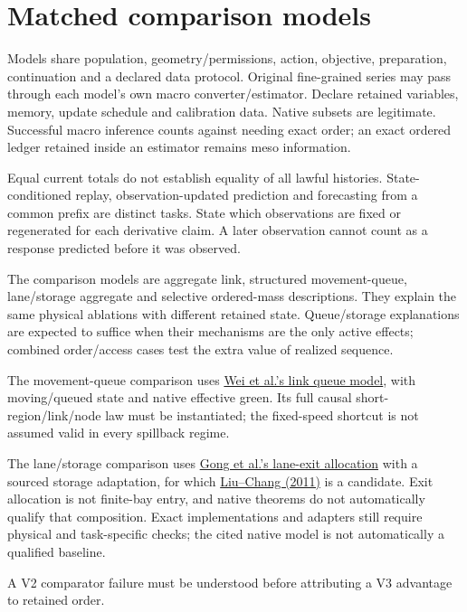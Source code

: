 \documentclass[10pt,a4paper]{article}
\begin{document}
\section{Matched comparison models}

Models share population, geometry/permissions, action, objective,
preparation, continuation and a declared data protocol.
Original fine-grained series may pass through each model's own macro
converter/estimator. Declare retained variables, memory, update schedule
and calibration data. Native subsets are legitimate. Successful macro
inference counts against needing exact order; an exact ordered ledger
retained inside an estimator remains meso information.

Equal current totals do not establish equality of all lawful histories.
State-conditioned replay, observation-updated prediction and forecasting
from a common prefix are distinct tasks. State which observations are
fixed or regenerated for each derivative claim. A later observation
cannot count as a response predicted before it was observed.


The comparison models are aggregate link, structured movement-queue,
lane/storage aggregate and selective ordered-mass descriptions. They
explain the same physical ablations with different retained state.
Queue/storage explanations are expected to suffice when their mechanisms
are the only active effects; combined order/access cases test the extra
value of realized sequence.
\par

The movement-queue comparison uses
\href{https://arxiv.org/html/2310.12249v2}{Wei et al.'s link queue model},
with moving/queued state and native effective green. Its full causal
short-region/link/node law must be instantiated; the fixed-speed shortcut
is not assumed valid in every spillback regime.

The lane/storage comparison uses
\href{https://www.sciencedirect.com/science/article/pii/S0191261525000578}
{Gong et al.'s lane-exit allocation} with a sourced storage adaptation,
for which \href{https://attap.umd.edu/wp-content/uploads/2022/05/TRC522.pdf}
{Liu--Chang (2011)} is a candidate. Exit allocation is not finite-bay
entry, and native theorems do not automatically qualify that composition.
Exact implementations and adapters still require physical and task-specific
checks; the cited native model is not automatically a qualified baseline.

A V2 comparator failure must be understood before attributing a V3
advantage to retained order.
\end{document}
